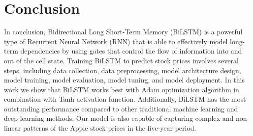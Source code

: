 \documentclass[a4paper]{article}
\begin{document}
\section{Conclusion}
In conclusion, Bidirectional Long Short-Term Memory (BiLSTM) is a powerful type of Recurrent Neural Network (RNN) that is able to effectively model long-term dependencies by using gates that control the flow of information into and out of the cell state. Training BiLSTM to predict stock prices involves several steps, including data collection, data preprocessing, model architecture design, model training, model evaluation, model tuning, and model deployment. In this work we show that BiLSTM works best with Adam optimization algorithm in combination with Tanh activation function. Additionally, BiLSTM has the most outstanding performance compared to other traditional machine learning and deep learning methods. Our model is also capable of capturing complex and non-linear patterns of the Apple stock prices in the five-year period.
\vfill
\pagebreak
\nocite{*}


\end{document}
